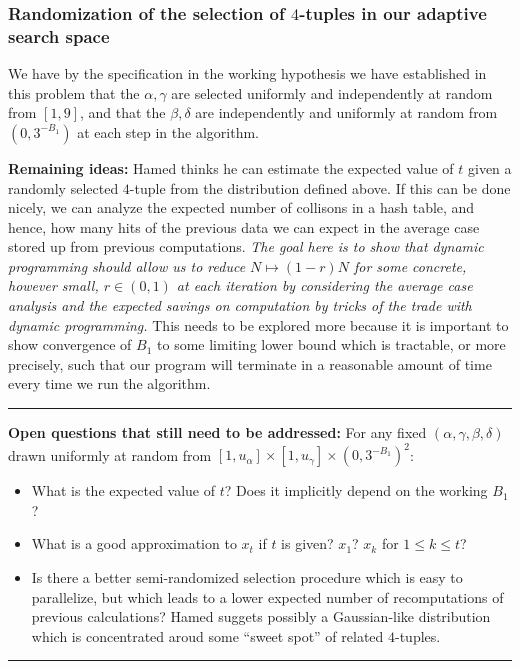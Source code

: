 \documentclass[12pt]{article}
\begin{document}
\subsubsection{Randomization of the selection of $4$-tuples in our adaptive search space} 

We have by the specification in the working hypothesis we have established in this problem that the 
$\alpha,\gamma$ are selected uniformly and independently at random from $[1, 9]$, and that the 
$\beta,\delta$ are independently and uniformly at random from $(0, 3^{-B_1})$ at each step in the 
algorithm. 

\noindent
\textbf{Remaining ideas:} 
Hamed thinks he can estimate the expected value of $t$ given a randomly selected $4$-tuple from the 
distribution defined above. If this can be done nicely, we can analyze the expected number of collisons in a 
hash table, and hence, how many hits of the previous data we can expect in the average case stored up from 
previous computations. \emph{The goal here is to show that dynamic programming should allow us to reduce 
$N \mapsto (1-r)N$ for some concrete, however small, $r \in (0, 1)$ 
at each iteration by considering the average case analysis and the 
expected savings on computation by tricks of the trade with dynamic programming.} This needs to be 
explored more because it is important to show convergence of $B_1$ to some limiting lower bound which is 
tractable, or more precisely, such that our program will terminate in a reasonable amount of 
time every time we run the algorithm. 

\bigskip\hrule\bigskip 
\noindent
\textbf{Open questions that still need to be addressed:} 
For any fixed $(\alpha,\gamma,\beta,\delta)$ drawn uniformly at random from 
$[1,u_{\alpha}] \times [1,u_{\gamma}] \times (0,3^{-B_1})^2$: 
\begin{itemize} 
\item What is the expected value of $t$? Does it implicitly depend on the working $B_1$? 
\item What is a good approximation to $x_t$ if $t$ is given? $x_1$? $x_k$ for $1 \leq k \leq t$? 
\item Is there a better semi-randomized selection procedure which is easy to parallelize, but which 
      leads to a lower expected number of recomputations of previous calculations? 
      Hamed suggets possibly a Gaussian-like distribution which is concentrated aroud some 
      ``sweet spot'' of related $4$-tuples. 
\end{itemize} 
\hrule\bigskip 
\end{document}
